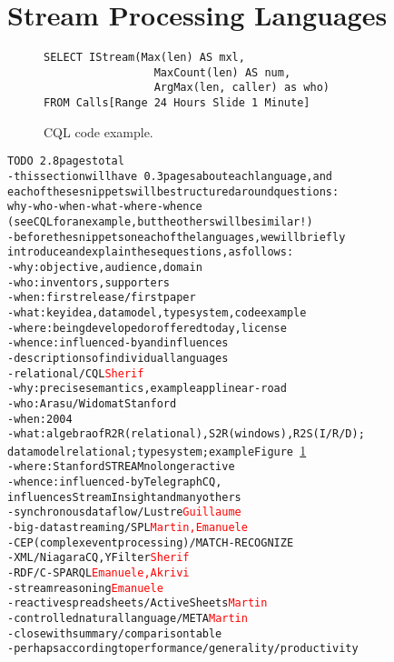\section{Stream Processing Languages}\label{sec:languages}

\begin{figure}
\begin{lstlisting}
SELECT IStream(Max(len) AS mxl,
                 MaxCount(len) AS num,
                 ArgMax(len, caller) as who)
FROM Calls[Range 24 Hours Slide 1 Minute]
\end{lstlisting}
\vspace*{-4mm}
\caption{\label{fig:cql}CQL code example.}
\end{figure}

\begin{alltt}TODO\scriptsize ~2.8 pages total
- this section will have ~0.3 pages about each language, and
  each of these snippets will be structured around questions:
  why-who-when-what-where-whence
  (see CQL for an example, but the others will be similar!)
- before the snippets on each of the languages, we will briefly
  introduce and explain these questions, as follows:
  - why: objective, audience, domain
  - who: inventors, supporters
  - when: first release / first paper
  - what: key idea, data model, type system, code example
  - where: being developed or offered today, license
  - whence: influenced-by and influences
- descriptions of individual languages
  - relational / CQL \cite{arasu_babu_widom_2006}   \textcolor{red}{Sherif}
    - why: precise semantics \cite{arasu_widom_2004}, example app linear-road \cite{arasu_et_al_2004}
    - who: Arasu/Widom at Stanford
    - when: 2004
    - what: algebra of R2R (relational), S2R (windows), R2S (I/R/D);
      data model relational; type system \cite{soule_et_al_2016}; example Figure~\ref{fig:cql}
    - where: Stanford STREAM no longer active
    - whence: influenced-by TelegraphCQ \cite{chandrasekaran_et_al_2003},
      influences StreamInsight \cite{ali_et_al_2009} and many others
  - synchronous dataflow / Lustre \cite{caspi_et_al_1987} \textcolor{red}{Guillaume}
  - big-data streaming / SPL \cite{hirzel_schneider_gedik_2017} \textcolor{red}{Martin, Emanuele}
  - CEP (complex event processing) / MATCH-RECOGNIZE \cite{zemke_et_al_2007} \cite{hirzel_2012} \color{red}{Angela}
  - XML / NiagaraCQ \cite{chen_et_al_2000}, YFilter \cite{diao_et_al_2002} \textcolor{red}{Sherif}
  - RDF / C-SPARQL \cite{barbieri_et_al_2009} \textcolor{red}{Emanuele, Akrivi}
  - stream reasoning \textcolor{red}{Emanuele}
  - reactive spreadsheets / ActiveSheets \cite{vaziri_et_al_2014} \textcolor{red}{Martin}
  - controlled natural language / META \cite{arnold_et_al_2016} \textcolor{red}{Martin}
- close with summary/comparison table
  - perhaps according to performance/generality/productivity
\end{alltt}

